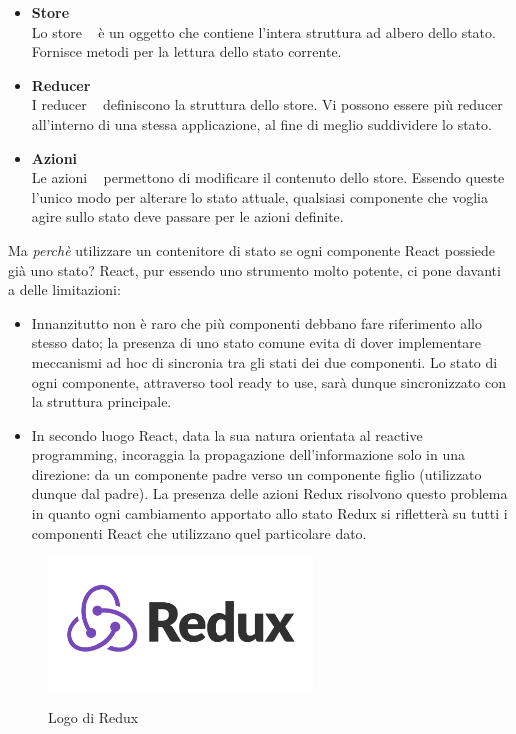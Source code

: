 \begin{itemize}
  \item \textbf{Store}\\
  Lo store ~\cite{store_redux} è un oggetto che contiene l'intera struttura ad albero dello stato.\newline
  Fornisce metodi per la lettura dello stato corrente.
  \item \textbf{Reducer}\\
  I reducer ~\cite{reducer_redux} definiscono la struttura dello store.\newline
  Vi possono essere più reducer all'interno di una stessa applicazione, al fine di meglio suddividere lo stato.
  \item \textbf{Azioni}\\
  Le azioni ~\cite{azioni_redux} permettono di modificare il contenuto dello store.\newline
  Essendo queste l'unico modo per alterare lo stato attuale, qualsiasi componente che voglia agire sullo stato deve passare per le azioni definite.
\end{itemize}
Ma \emph{perchè} utilizzare un contenitore di stato se ogni componente React possiede già uno stato?
React, pur essendo uno strumento molto potente, ci pone davanti a delle limitazioni:
\begin{itemize}
  \item
  Innanzitutto non è raro che più componenti debbano fare riferimento allo stesso dato; la presenza di uno stato comune evita di dover implementare meccanismi ad hoc di sincronia tra gli stati dei due componenti.\newline
  Lo stato di ogni componente, attraverso tool ready to use, sarà dunque sincronizzato con la struttura principale.
  \item
  In secondo luogo React, data la sua natura orientata al reactive programming, incoraggia la propagazione dell'informazione solo in una direzione: da un componente padre verso un componente figlio (utilizzato dunque dal padre).\newline
  La presenza delle azioni Redux risolvono questo problema in quanto ogni cambiamento apportato allo stato Redux si rifletterà su tutti i componenti React che utilizzano quel particolare dato.
\end{itemize}
\begin{figure}[H]
    \caption{Logo di Redux ~\cite{redux:online}}
    \centering
    \includegraphics[width=70mm]{img/logos/redux_logo.png}
    \label{fig:redux_logo}
\end{figure}

